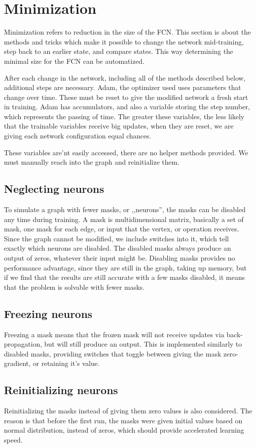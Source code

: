 \documentclass[12pt]{report}
\begin{document}
\section{Minimization}
Minimization refers to reduction in the size of the FCN. This section is about the methods and tricks which make it possible to change the network mid-training, step back to an earlier state, and compare states. This way determining the minimal size for the FCN can be automatized.\par
After each change in the network, including all of the methods described below, additional steps are necessary. Adam, the optimizer used uses parameters that change over time. These must be reset to give the modified network a fresh start in training. Adam has accumulators, and also a variable storing the step number, which represents the passing of time. The greater these variables, the less likely that the trainable variables receive big updates, when they are reset, we are giving each network configuration equal chances.\par
These variables are'nt easily accessed, there are no helper methods provided. We must manually reach into the graph and reinitialize them.
\subsection{Neglecting neurons}
To simulate a graph with fewer masks, or ,,neurons'', the masks can be disabled any time during training. A mask is  multidimensional matrix, basically a set of mask, one mask for each edge, or input that the vertex, or operation receives. Since the graph cannot be modified, we include switches into it, which tell exactly which neurons are disabled. The disabled masks always produce an output of zeros, whatever their input might be. Disabling masks provides no performance advantage, since they are still in the graph, taking up memory, but if we find that the results are still accurate with a few masks disabled, it means that the problem is solvable with fewer masks.
\subsection{Freezing neurons}
Freezing a mask means that the frozen mask will not receive updates via back-propagation, but will still produce an output. This is implemented similarly to disabled masks, providing switches that toggle between giving the mask zero-gradient, or retaining it's value.
\subsection{Reinitializing neurons}
Reinitializing the masks instead of giving them zero values is also considered. The reason is that before the first run, the masks were given initial values based on normal distribution, instead of zeros, which should provide accelerated learning speed.
\end{document}
